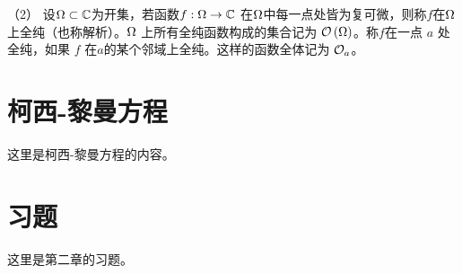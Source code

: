 \documentclass[
  chinese-hans,
  letterpaper,
  fontset=fandol]{ctexbook}
\theoremstyle{definition}
\theoremstyle{plain}
\theoremstyle{definition}
\theoremstyle{plain}
\theoremstyle{definition}
\theoremstyle{remark}
\begin{document}
（2） 设\(\Omega\subset\mathbb{C}\)为开集，若函数\(f:\Omega\rightarrow\mathbb{C}\)
在\(\Omega\)中每一点处皆为复可微，则称\(f\)在\(\Omega\)上全纯（也称解析）。\(\Omega\)
上所有全纯函数构成的集合记为
\(\mathcal{O}\left(\Omega\right)\)。称\(f\)在一点
\(a\) 处全纯，如果 \(f\) 在\(a\)的某个邻域上全纯。这样的函数全体记为
\(\mathcal{O}_{a}\)。

\section{柯西-黎曼方程}\label{ux67efux897f-ux9eceux66fcux65b9ux7a0b}

这里是柯西-黎曼方程的内容。

\section{习题}\label{ux4e60ux9898-1}

这里是第二章的习题。


\backmatter
\end{document}
